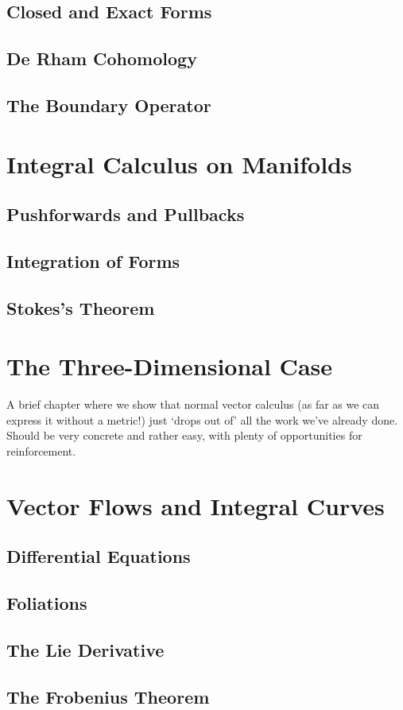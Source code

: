 \documentclass[oneside,english]{amsbook}
\numberwithin{section}{chapter}
\theoremstyle{plain}
\theoremstyle{definition}
\begin{document}
		\section{Closed and Exact Forms}
		\section{De Rham Cohomology}
		\section{The Boundary Operator}

	\chapter{Integral Calculus on Manifolds}

		\section{Pushforwards and Pullbacks}
		\section{Integration of Forms}
		\section{Stokes's Theorem}

	\chapter{The Three-Dimensional Case}
	
		A brief chapter where we show that normal vector calculus (as far as we can express it without a metric!) just `drops out of' all the work we've already done. Should be very concrete and rather easy, with plenty of opportunities for reinforcement.

	\chapter{Vector Flows and Integral Curves}
	
		\section{Differential Equations}

		\section{Foliations}

		\section{The Lie Derivative}
	
		\section{The Frobenius Theorem}
\end{document}
